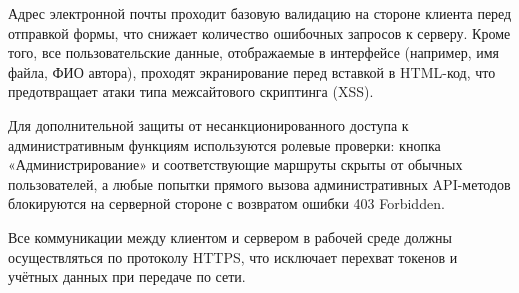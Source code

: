Адрес электронной почты проходит базовую валидацию на стороне клиента перед отправкой формы, что снижает количество ошибочных запросов к серверу. Кроме того, все пользовательские данные, отображаемые в интерфейсе (например, имя файла, ФИО автора), проходят экранирование перед вставкой в HTML-код, что предотвращает атаки типа межсайтового скриптинга (XSS).

Для дополнительной защиты от несанкционированного доступа к административным функциям используются ролевые проверки: кнопка «Администрирование» и соответствующие маршруты скрыты от обычных пользователей, а любые попытки прямого вызова административных API-методов блокируются на серверной стороне с возвратом ошибки 403 Forbidden.

Все коммуникации между клиентом и сервером в рабочей среде должны осуществляться по протоколу HTTPS, что исключает перехват токенов и учётных данных при передаче по сети. 